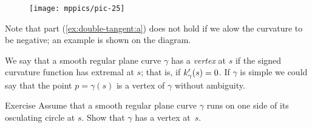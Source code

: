 \begin{wrapfigure}{r}{35 mm}
\vskip-0mm
\centering
\texttt{[image: mppics/pic-25]}
\vskip0mm
\end{wrapfigure}

Note that part (\ref{ex:double-tangent:a}) does not hold if we alow the curvature to be negative; an example is shown on the diagram.

We say that a smooth regular plane curve $\gamma$ has a \emph{vertex} at $s$
if the signed curvature function has extremal at $s$;
that is, if $k'_\gamma(s)=0$.
If $\gamma$ is simple we could say that the point $p=\gamma(s)$ is a vertex of $\gamma$ without ambiguity.

\begin{thm}{Exercise} 
Assume that a smooth regular plane curve $\gamma$ runs on one side of its osculating circle at $s$.
Show that $\gamma$ has a vertex at~$s$.
\end{thm}

